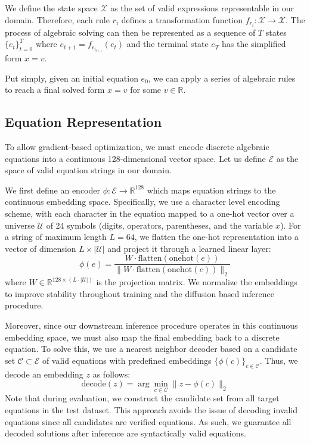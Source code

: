 \documentclass{article}
\begin{document}
We define the state space $\mathcal{X}$ as the set of valid expressions representable in our domain. Therefore, each rule $r_i$ defines a transformation function $f_{r_i}: \mathcal{X} \rightarrow \mathcal{X}$. The process of algebraic solving can then be represented as a sequence of $T$ states $\{e_t\}_{t=0}^{T}$ where $e_{t+1} = f_{r_{i_{t+1}}}(e_t)$ and the terminal state $e_T$ has the simplified form $x = v$. 

Put simply, given an initial equation $e_0$, we can apply a series of algebraic rules to reach a final solved form $x = v$ for some $v \in \mathbb{R}$.

\subsection{Equation Representation}
\label{representation}
To allow gradient-based optimization, we must encode discrete algebraic equations into a continuous 128-dimensional vector space. Let us define $\mathcal{E}$ as the space of valid equation strings in our domain.

We first define an encoder $\phi: \mathcal{E} \rightarrow \mathbb{R}^{128}$ which maps equation strings to the continuous embedding space. Specifically, we use a character level encoding scheme, with each character in the equation mapped to a one-hot vector over a universe $\mathcal{U}$ of 24 symbols (digits, operators, parentheses, and the variable $x$). For a string of maximum length $L = 64$, we flatten the one-hot representation into a vector of dimension $L \times |\mathcal{U}|$ and project it through a learned linear layer:
\begin{equation}
\phi(e) = \frac{W \cdot \text{flatten}(\text{onehot}(e))}{\|W \cdot \text{flatten}(\text{onehot}(e))\|_2}
\end{equation}
where $W \in \mathbb{R}^{128 \times (L \cdot |\mathcal{U}|)}$ is the projection matrix. We normalize the embeddings to improve stability throughout training and the diffusion based inference procedure.

Moreover, since our downstream inference procedure operates in this continuous embedding space, we must also map the final embedding back to a discrete equation. To solve this, we use a nearest neighbor decoder based on a candidate set $\mathcal{C} \subset \mathcal{E}$ of valid equations with predefined embeddings $\{\phi(c)\}_{c \in \mathcal{C}}$. Thus, we decode an embedding $z$ as follows:
$$
\text{decode}(z) = \arg\min_{c \in \mathcal{C}} \|z - \phi(c)\|_2
$$
Note that during evaluation, we construct the candidate set from all target equations in the test dataset. This approach avoids the issue of decoding invalid equations since all candidates are verified equations. As such, we guarantee all decoded solutions after inference are syntactically valid equations. 
\end{document}
